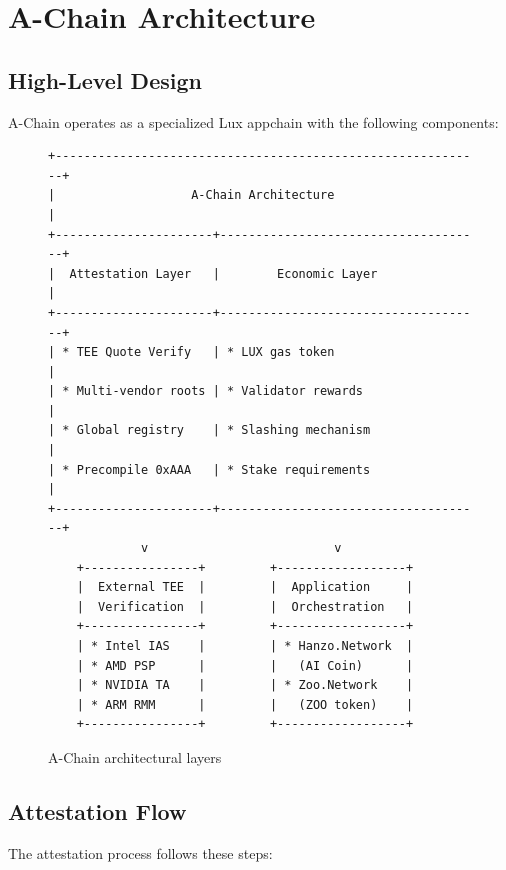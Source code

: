 \section{A-Chain Architecture}


\subsection{High-Level Design}

A-Chain operates as a specialized Lux appchain with the following components:

\begin{figure}[h]
\centering
\begin{verbatim}
+------------------------------------------------------------+
|                   A-Chain Architecture                      |
+----------------------+-------------------------------------+
|  Attestation Layer   |        Economic Layer               |
+----------------------+-------------------------------------+
| * TEE Quote Verify   | * LUX gas token                     |
| * Multi-vendor roots | * Validator rewards                 |
| * Global registry    | * Slashing mechanism                |
| * Precompile 0xAAA   | * Stake requirements                |
+----------------------+-------------------------------------+
             v                          v
    +----------------+         +------------------+
    |  External TEE  |         |  Application     |
    |  Verification  |         |  Orchestration   |
    +----------------+         +------------------+
    | * Intel IAS    |         | * Hanzo.Network  |
    | * AMD PSP      |         |   (AI Coin)      |
    | * NVIDIA TA    |         | * Zoo.Network    |
    | * ARM RMM      |         |   (ZOO token)    |
    +----------------+         +------------------+
\end{verbatim}
\caption{A-Chain architectural layers}
\end{figure}

\subsection{Attestation Flow}

The attestation process follows these steps:

